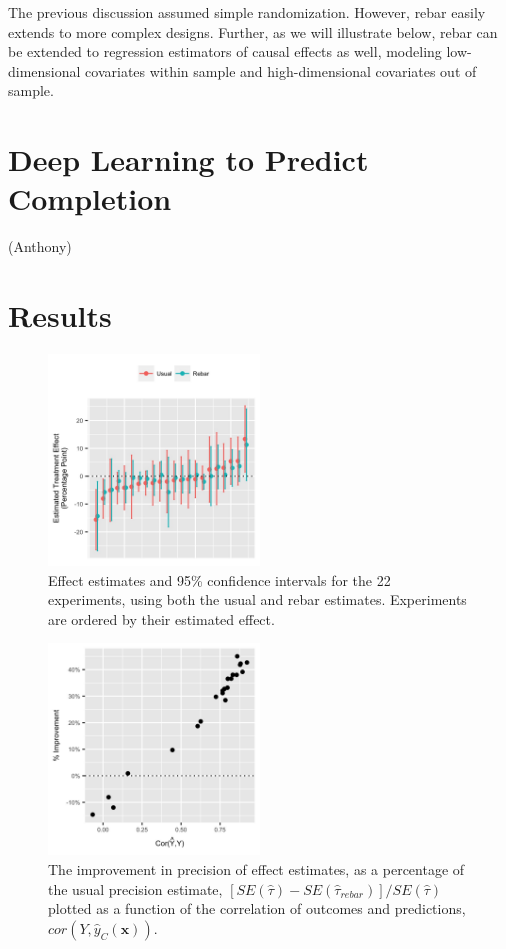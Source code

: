 \documentclass{edm_template}
\newcommand{\tauhat}{\hat{\tau}}
\newcommand{\rebar}{\hat{\tau}_{rebar}}
\newcommand{\model}[1]{\hat{y}_C(#1)}
\begin{document}
The previous discussion assumed simple randomization. 
However, rebar easily extends to more complex designs.
Further, as we will illustrate below, rebar can be extended to regression estimators of causal effects as well, modeling low-dimensional covariates within sample and high-dimensional covariates out of sample. 


\section{Deep Learning to Predict Completion}
(Anthony)

\section{Results}
\begin{figure}
\centering
\includegraphics[width=0.5\textwidth]{estEff1.jpg}
\caption{Effect estimates and 95\% confidence intervals for the 22 experiments, using both the usual and rebar estimates. Experiments are ordered by their estimated effect.}
\label{fig:estEff1}
\end{figure}
\begin{figure}
\centering
\includegraphics[width=0.5\textwidth]{corVsSE.jpg}
\caption{The improvement in precision of effect estimates, as a percentage of the usual precision estimate, $[SE(\tauhat)-SE(\rebar)]/SE(\tauhat)$ plotted as a function of the correlation of outcomes and predictions, $cor(Y,\model{\bm{x}})$.}
\end{figure}
\end{document}
